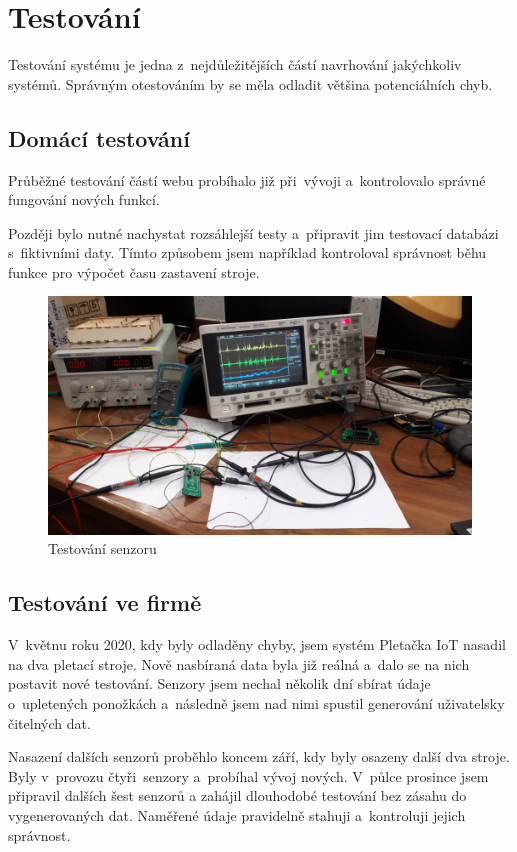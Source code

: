 \chapter{Testování}
Testování systému je jedna z~nejdůležitějších částí navrhování jakýchkoliv systémů.
Správným otestováním by se měla odladit většina potenciálních chyb.



\section{Domácí testování}
Průběžné testování částí webu probíhalo již při~vývoji a~kontrolovalo správné fungování nových funkcí.

Později bylo nutné nachystat rozsáhlejší testy a~připravit jim testovací databázi s~fiktivními daty.
Tímto způsobem jsem například kontroloval správnost běhu funkce pro výpočet času zastavení stroje.


\begin{figure}[htbp]
    \centering
    \includegraphics[width=\textwidth]{img/testovani.png}
    \caption{Testování senzoru}
    \label{fig:SenzorNaStroji}
\end{figure}

\section{Testování ve firmě}
V~květnu roku 2020, kdy byly odladěny chyby, jsem systém Pletačka IoT nasadil na dva pletací stroje.
Nově nasbíraná data byla již reálná a~dalo se na nich postavit nové testování.
Senzory jsem nechal několik dní sbírat údaje o~upletených ponožkách a~následně jsem nad nimi spustil generování uživatelsky čitelných dat.

Nasazení dalších senzorů proběhlo koncem září, kdy byly osazeny další dva stroje. 
Byly v provozu čtyři senzory a probíhal vývoj nových.
V půlce prosince jsem připravil dalších šest senzorů a zahájil dlouhodobé testování bez zásahu do vygenerovaných dat. Naměřené údaje pravidelně stahuji a kontroluji jejich správnost.


